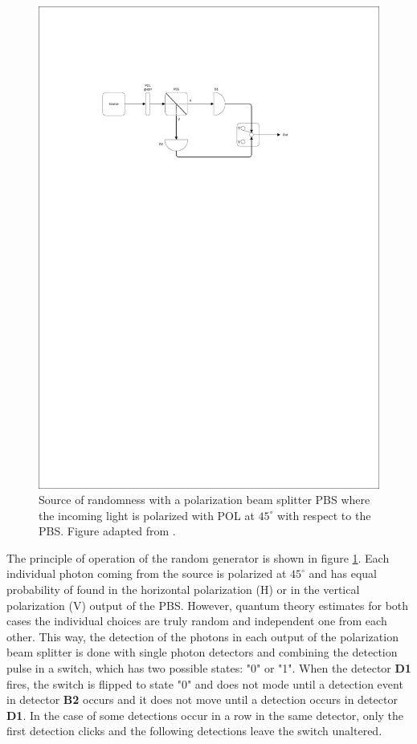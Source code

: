 \begin{figure}[H]
    \centering
        \includegraphics[clip, trim=3cm 20cm 5cm 5cm, width=1.00\textwidth]{./sdf/qrng/figures_raw/Random_Number_Generator.pdf}
    \caption{Source of randomness with a polarization beam splitter PBS where the incoming light is polarized with POL at $45^{\circ}$ with respect to the PBS. Figure adapted from \cite{Zeilinger}.}\label{qrng}
\end{figure}

The principle of operation of the random generator is shown in figure \ref{qrng}. Each individual photon coming from the source is polarized at $45^\circ$ and has equal probability of found in the horizontal polarization (H) or in the vertical polarization (V) output of the PBS. However, quantum theory estimates for both cases the individual choices are truly random and independent one from each other. This way, the detection of the photons in each output of the polarization beam splitter is done with single photon detectors and combining the detection pulse in a switch, which has two possible states: "0" \space or "1". When the detector \textbf{D1} fires, the switch is flipped to state "0" \space and does not mode until a detection event in detector \textbf{B2} occurs and it does not move until a detection occurs in detector \textbf{D1}. In the case of some detections occur in a row in the same detector, only the first detection clicks and the following detections leave the switch unaltered.

